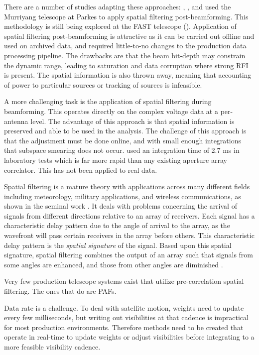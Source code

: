 \documentclass{pas}
\begin{document}
There are a number of studies adapting these approaches: \cite{kocz_radio_2010}, \cite{kocz_enhanced_2012}, 
and \cite{chippendale_interference_2017} used the Murriyang telescope at Parkes to apply spatial filtering post-beamforming. 
This methodology is still being explored at the FAST telescope (\cite{bai_radio_2025}). 
Application of spatial filtering post-beamforming is attractive as it can be 
carried out offline and used on archived data, and required little-to-no changes
to the production data processing pipeline.
The drawbacks are that the beam bit-depth may constrain the dynamic range, leading to 
saturation and data corruption where strong RFI is present. 
The spatial information is also thrown away, meaning that accounting of power to 
particular sources or tracking of sources is infeasible.

A more challenging task is the application of spatial filtering during beamforming.
This operates directly on the complex voltage data at a per-antenna level. 
The advantage of this approach is that spatial information is preserved and able to be
used in the analysis. 
The challenge of this approach is that the adjustment must be done online, and with
small enough integrations that subspace smearing does not occur.
\cite{whipple_wideband_2023} used an integration time of 2.7 ms in laboratory tests
which is far more rapid than any existing aperture array correlator. 
This has not been applied to real data.


Spatial filtering is a mature theory with applications across many different
fields including meteorology, military applications, and wireless
communications, as shown in the seminal work \cite{van_trees_optimum_2002}. It
deals with problems concerning the arrival of signals from different directions
relative to an array of receivers. Each signal has a characteristic delay
pattern due to the angle of arrival to the array, as the wavefront will pass
certain receivers in the array before others. This characteristic delay pattern
is the \textit{spatial signature} of the signal. Based upon this spatial
signature, spatial filtering combines the output of an array such that signals
from some angles are enhanced, and those from other angles are diminished
\cite{van_trees_optimum_2002}.

Very few production telescope systems exist that utilize pre-correlation
spatial filtering. The ones that do are PAFs.

Data rate is a challenge. To deal with satellite motion, weights need to update
every few milliseconds, but writing out visibilities at that cadence is
impractical for most production environments. 
Therefore methods need to be created that operate in real-time to update
weights or adjust visibilities before integrating to a more feasible 
visibility cadence.
\end{document}
